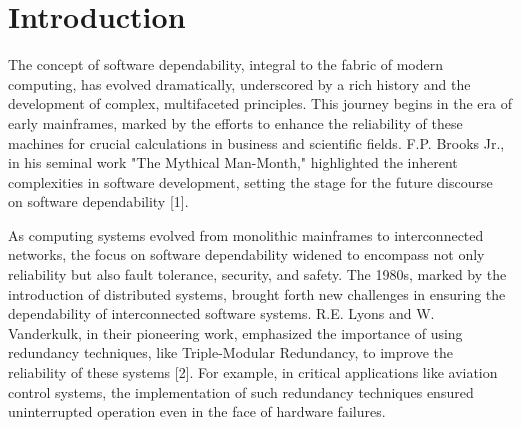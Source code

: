 \documentclass[sigconf]{acmart}
\begin{document}




\maketitle

\section{Introduction}
The concept of software dependability, integral to the fabric of modern computing, has evolved dramatically, underscored by a rich history and the development of complex, multifaceted principles. This journey begins in the era of early mainframes, marked by the efforts to enhance the reliability of these machines for crucial calculations in business and scientific fields. F.P. Brooks Jr., in his seminal work "The Mythical Man-Month," highlighted the inherent complexities in software development, setting the stage for the future discourse on software dependability [1].

As computing systems evolved from monolithic mainframes to interconnected networks, the focus on software dependability widened to encompass not only reliability but also fault tolerance, security, and safety. The 1980s, marked by the introduction of distributed systems, brought forth new challenges in ensuring the dependability of interconnected software systems. R.E. Lyons and W. Vanderkulk, in their pioneering work, emphasized the importance of using redundancy techniques, like Triple-Modular Redundancy, to improve the reliability of these systems [2]. For example, in critical applications like aviation control systems, the implementation of such redundancy techniques ensured uninterrupted operation even in the face of hardware failures.
\end{document}
